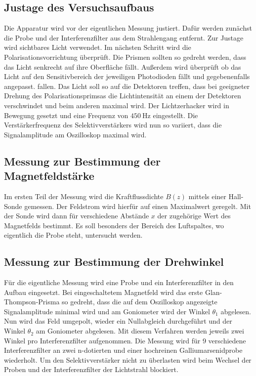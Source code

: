\subsection{Justage des Versuchsaufbaus}
\label{sub:Justage}

Die Apparatur wird vor der eigentlichen Messung justiert. Dafür werden zunächst die Probe und der Interferenzfilter aus dem Strahlengang
entfernt. Zur Justage wird sichtbares Licht verwendet.
Im nächsten Schritt wird die Polarisationsvorrichtung überprüft. Die Prismen sollten so gedreht werden, dass das Licht senkrecht auf ihre Oberfläche fällt.
Außerdem wird überprüft ob das Licht auf den Sensitivbereich der jeweiligen Photodioden fällt und gegebenenfalls angepasst.
fallen. Das Licht soll so auf die Detektoren treffen, dass bei geeigneter Drehung des Polarisationsprimsas die Lichtintensität an einem der Detektoren verschwindet und beim anderen maximal wird.
Der Lichtzerhacker wird in Bewegung gesetzt und eine Frequenz von $\qty{450}{\hertz}$ eingestellt.
Die Verstärkerfrequenz des Selektivverstärkers wird nun so variiert, dass die Signalamplitude am Oszilloskop maximal wird.




\subsection{Messung zur Bestimmung der Magnetfeldstärke}
\label{sub:Magnetfeld}

Im ersten Teil der Messung wird die Kraftflussdichte $B(z)$ mittels einer Hall-Sonde gemessen.
Der Feldstrom wird hierfür auf einen Maximalwert geregelt. Mit der Sonde wird dann für verschiedene Abstände $x$ der zugehörige
Wert des Magnetfelds bestimmt. Es soll besonders der Bereich des Luftspaltes, wo eigentlich die Probe steht, untersucht werden.


\subsection{Messung zur Bestimmung der Drehwinkel}
\label{sub:Drehwinkel}

Für die eigentliche Messung wird eine Probe und ein Interferenzfilter in den Aufbau eingesetzt. Bei eingeschaltetem Magnetfeld wird das erste Glan-Thompson-Prisma
so gedreht, dass die auf dem Oszilloskop angezeigte Signalamplitude minimal wird und am Goniometer wird der Winkel $\theta_1$ abgelesen.
Nun wird das Feld umgepolt, wieder ein Nullabgleich durchgeführt und der Winkel $\theta_2$ am Goniometer abgelesen.
Mit diesem Verfahren werden jeweils zwei Winkel pro Interferenzfilter aufgenommen. Die Messung wird für 9 verschiedene Interferenzfilter
an zwei n-dotierten und einer hochreinen Galliumarsenidprobe wiederholt.
Um den Selektivverstärker nicht zu überlasten wird beim Wechsel der Proben und der Interferenzfilter der Lichtstrahl blockiert.






